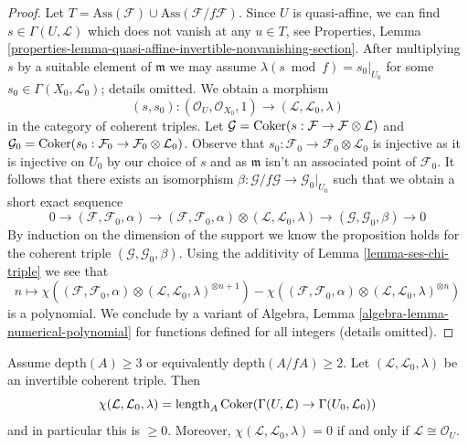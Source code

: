 \begin{proof}
\medskip\noindent
Let $T = \text{Ass}(\mathcal{F}) \cup \text{Ass}(\mathcal{F}/f\mathcal{F})$.
Since $U$ is quasi-affine, we can find $s \in \Gamma(U, \mathcal{L})$
which does not vanish at any $u \in T$, see
Properties, Lemma
\ref{properties-lemma-quasi-affine-invertible-nonvanishing-section}.
After multiplying $s$ by a suitable element of $\mathfrak m$
we may assume $\lambda(s \bmod f) = s_0|_{U_0}$ for some
$s_0 \in \Gamma(X_0, \mathcal{L}_0)$; details omitted.
We obtain a morphism
$$
(s, s_0) :
(\mathcal{O}_U, \mathcal{O}_{X_0}, 1)
\longrightarrow
(\mathcal{L}, \mathcal{L}_0, \lambda)
$$
in the category of coherent triples. Let
$\mathcal{G} = \mathop{\mathrm{Coker}}(s : \mathcal{F} \to \mathcal{F} \otimes \mathcal{L})$
and
$\mathcal{G}_0 = \mathop{\mathrm{Coker}}(s_0 : \mathcal{F}_0 \to
\mathcal{F}_0 \otimes \mathcal{L}_0)$. Observe that $s_0 : \mathcal{F}_0 \to
\mathcal{F}_0 \otimes \mathcal{L}_0$ is injective as it is injective
on $U_0$ by our choice of $s$ and as $\mathfrak m$ isn't an
associated point of $\mathcal{F}_0$. It follows that
there exists an
isomorphism $\beta : \mathcal{G}/f\mathcal{G} \to \mathcal{G}_0|_{U_0}$
such that we obtain a short exact sequence
$$
0 \to
(\mathcal{F}, \mathcal{F}_0, \alpha) \to
(\mathcal{F}, \mathcal{F}_0, \alpha) \otimes
(\mathcal{L}, \mathcal{L}_0, \lambda) \to
(\mathcal{G}, \mathcal{G}_0, \beta) \to 0
$$
By induction on the dimension of the support we know the proposition
holds for the coherent triple $(\mathcal{G}, \mathcal{G}_0, \beta)$.
Using the additivity of Lemma \ref{lemma-ses-chi-triple}
we see that
$$
n \longmapsto 
\chi((\mathcal{F}, \mathcal{F}_0, \alpha) \otimes
(\mathcal{L}, \mathcal{L}_0, \lambda)^{\otimes n + 1})
-
\chi((\mathcal{F}, \mathcal{F}_0, \alpha) \otimes
(\mathcal{L}, \mathcal{L}_0, \lambda)^{\otimes n})
$$
is a polynomial. We conclude by a variant of
Algebra, Lemma \ref{algebra-lemma-numerical-polynomial}
for functions defined for all integers (details omitted).
\end{proof}

\begin{lemma}
\label{lemma-nonnegative-chi-triple}
Assume $\text{depth}(A) \geq 3$ or equivalently
$\text{depth}(A/fA) \geq 2$. Let $(\mathcal{L}, \mathcal{L}_0, \lambda)$
be an invertible coherent triple. Then
$$
\chi(\mathcal{L}, \mathcal{L}_0, \lambda) =
\text{length}_A \mathop{\mathrm{Coker}}(\Gamma(U, \mathcal{L}) \to \Gamma(U_0, \mathcal{L}_0))
$$
and in particular this is $\geq 0$. Moreover, 
$\chi(\mathcal{L}, \mathcal{L}_0, \lambda) = 0$ if and only if
$\mathcal{L} \cong \mathcal{O}_U$.
\end{lemma}

